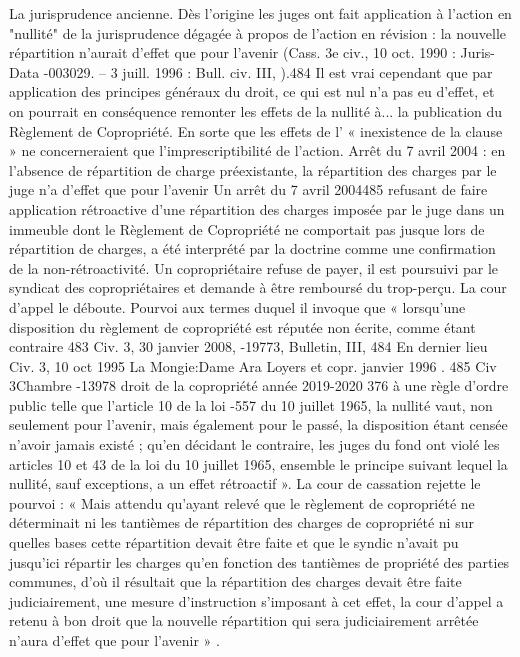 La jurisprudence ancienne.
Dès l’origine les juges ont fait application à l'action en "nullité" de la jurisprudence dégagée à propos de l'action en révision : la nouvelle répartition n'aurait d'effet que pour l'avenir (Cass. 3e civ., 10 oct. 1990 : Juris-Data -003029. – 3 juill. 1996 : Bull. civ. III, ).484
Il est vrai cependant que par application des principes généraux du droit, ce qui est nul n'a pas eu d'effet, et on pourrait en conséquence remonter les effets de la nullité à... la publication du Règlement de Copropriété.
En sorte que les effets de l’ « inexistence de la clause » ne concerneraient que l’imprescriptibilité de l’action.
Arrêt du 7 avril 2004 : en l’absence de répartition de charge préexistante, la répartition des charges par le juge n’a d’effet que pour l’avenir
Un arrêt du 7 avril 2004485 refusant de faire application rétroactive d’une répartition des charges imposée par le juge dans un immeuble dont le Règlement de Copropriété ne comportait pas jusque lors de répartition de charges, a été interprété par la doctrine comme une confirmation de la non-rétroactivité.
Un copropriétaire refuse de payer, il est poursuivi par le syndicat des copropriétaires et demande à être remboursé du trop-perçu. La cour d’appel le déboute. Pourvoi aux termes duquel il invoque que « lorsqu'une disposition du règlement de copropriété est réputée non écrite, comme étant contraire
483 Civ. 3\degres, 30 janvier 2008, -19773, Bulletin, III, 
484 En dernier lieu Civ. 3\degres, 10 oct 1995 La Mongie:Dame Ara Loyers et copr. janvier 1996 .
485 Civ 3\degres Chambre -13978
droit de la copropriété année 2019-2020
376
à une règle d'ordre public telle que l'article 10 de la loi -557 du 10 juillet 1965, la nullité vaut, non seulement pour l'avenir, mais également pour le passé, la disposition étant censée n'avoir jamais existé ; qu'en décidant le contraire, les juges du fond ont violé les articles 10 et 43 de la loi du 10 juillet 1965, ensemble le principe suivant lequel la nullité, sauf exceptions, a un effet rétroactif ».
La cour de cassation rejette le pourvoi : « Mais attendu qu'ayant relevé que le règlement de copropriété ne déterminait ni les tantièmes de répartition des charges de copropriété ni sur quelles bases cette répartition devait être faite et que le syndic n'avait pu jusqu'ici répartir les charges qu'en fonction des tantièmes de propriété des parties communes, d'où il résultait que la répartition des charges devait être faite judiciairement, une mesure d'instruction s'imposant à cet effet, la cour d'appel a retenu à bon droit que la nouvelle répartition qui sera judiciairement arrêtée n'aura d'effet que pour l'avenir » .
